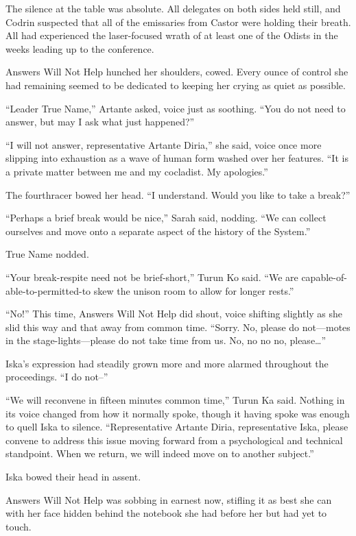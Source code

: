 The silence at the table was absolute. All delegates on both sides held still, and Codrin suspected that all of the emissaries from Castor were holding their breath. All had experienced the laser-focused wrath of at least one of the Odists in the weeks leading up to the conference.

Answers Will Not Help hunched her shoulders, cowed. Every ounce of control she had remaining seemed to be dedicated to keeping her crying as quiet as possible.

``Leader True Name,'' Artante asked, voice just as soothing. ``You do not need to answer, but may I ask what just happened?''

``I will not answer, representative Artante Diria,'' she said, voice once more slipping into exhaustion as a wave of human form washed over her features. ``It is a private matter between me and my cocladist. My apologies.''

The fourthracer bowed her head. ``I understand. Would you like to take a break?''

``Perhaps a brief break would be nice,'' Sarah said, nodding. ``We can collect ourselves and move onto a separate aspect of the history of the System.''

True Name nodded.

``Your break-respite need not be brief-short,'' Turun Ko said. ``We are capable-of-able-to-permitted-to skew the unison room to allow for longer rests.''

``No!'' This time, Answers Will Not Help did shout, voice shifting slightly as she slid this way and that away from common time. ``Sorry. No, please do not—motes in the stage-lights—please do not take time from us. No, no no no, please\ldots{}''

Iska's expression had steadily grown more and more alarmed throughout the proceedings. ``I do not--''

``We will reconvene in fifteen minutes common time,'' Turun Ka said. Nothing in its voice changed from how it normally spoke, though it having spoke was enough to quell Iska to silence. ``Representative Artante Diria, representative Iska, please convene to address this issue moving forward from a psychological and technical standpoint. When we return, we will indeed move on to another subject.''

Iska bowed their head in assent.

Answers Will Not Help was sobbing in earnest now, stifling it as best she can with her face hidden behind the notebook she had before her but had yet to touch.

